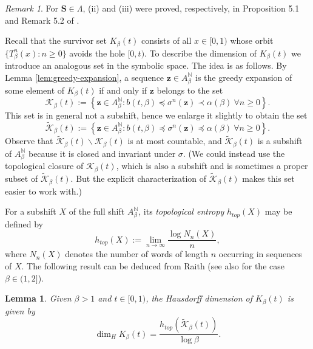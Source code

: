 \documentclass[12pt]{amsart}
\newtheorem{lemma}[theorem]{Lemma}
\theoremstyle{definition}
\theoremstyle{remark}
\newtheorem{remark}[theorem]{Remark}
\numberwithin{equation}{section}
\newcommand{\N}{\ensuremath{\mathbb{N}}}
\newcommand{\cs}{ {\mathbf{S}}}
\newcommand{\z}{\mathbf{z}}
\newcommand{\set}[1]{\left\{#1\right\}}
\newcommand{\f}{\infty}
\newcommand{\al}{\alpha}
\newcommand{\lle}{\preccurlyeq}
\newcommand{\si}{\sigma}
\newcommand{\K}{\mathcal K}
\begin{document}
{\begin{remark}
For $\cs\in\Lambda$, (ii) and (iii) were proved, respectively, in Proposition 5.1 and Remark 5.2 of \cite{Allaart-Kong-2021}.
\end{remark}

Recall that the survivor set $K_\beta(t)$ consists of all $x\in[0,1)$ whose orbit $\{T^n_\beta(x): n\ge 0\}$ avoids the hole $[0,t)$. To describe the dimension of $K_\beta(t)$ we introduce an analogous set in the symbolic space. The idea is as follows. By Lemma \ref{lem:greedy-expansion}, a sequence $\z\in A_\beta^\N$ is the greedy expansion of some element of $K_\beta(t)$ if and only if $\z$ belongs to the set
\[
\K_\beta(t):=\set{\z\in A_\beta^\N: b(t,\beta)\lle\si^n(\z)\prec \al(\beta)\ \forall n\ge 0}.
\]
This set is in general not a subshift, hence we enlarge it slightly to obtain the set
\begin{equation} \label{eq:K-tilde}
\widetilde{\K}_\beta(t):=\set{\z\in A_\beta^\N: b(t,\beta)\lle\si^n(\z)\lle \al(\beta)\ \forall n\ge 0}.
\end{equation}
Observe that $\widetilde{\K}_\beta(t)\backslash \K_\beta(t)$ is at most countable, and $\widetilde{\K}_\beta(t)$ is a subshift of $A_\beta^\N$ because it is closed and invariant under $\sigma$. (We could instead use the topological closure of $\K_\beta(t)$, which is also a subshift and is sometimes a proper subset of $\widetilde{\K}_\beta(t)$. But the explicit characterization of $\widetilde{\K}_\beta(t)$ makes this set easier to work with.)

For a subshift $X$ of the full shift $A_\beta^\N$, its \emph{topological entropy} $h_{top}(X)$ may be defined by
\[
h_{top}(X):=\lim_{n\to\f}\frac{\log N_n(X)}{n},
\]
where $N_n(X)$ denotes the number of words of length $n$ occurring in sequences of $X$. 
The following result can be deduced from Raith \cite{Raith-94} (see also \cite{Kalle-Kong-Langeveld-Li-18} for the case $\beta\in(1,2]$).

\begin{lemma} \label{lem:dim-survivorset}
Given $\beta>1$ and $t\in[0,1)$, the Hausdorff dimension of $K_\beta(t)$ is given by
\[
\dim_H K_\beta(t) =\frac{h_{top}(\widetilde{\K}_\beta(t))}{\log\beta}.
\]
\end{lemma}

}
\end{document}
